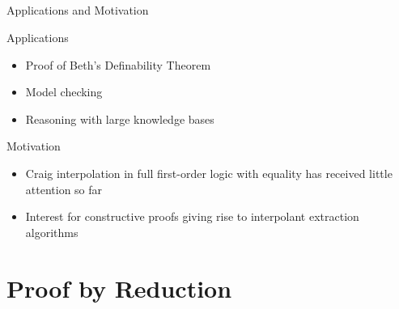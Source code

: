 \documentclass[final,compress]{beamer}
\begin{document}
\subsection{}
\begin{frame}{Applications and Motivation}
	\begin{block}{Applications}
		\begin{itemize}
			\item Proof of Beth's Definability Theorem
			\item Model checking
			\item Reasoning with large knowledge bases
		\end{itemize}
	\end{block}
	\pause
	\begin{block}{Motivation}
		\begin{itemize}
			\item Craig interpolation in full first-order logic with equality has received little attention so far
			\item Interest for constructive proofs giving rise to interpolant extraction algorithms
		\end{itemize}
	\end{block}

\end{frame}



\section{Proof by Reduction}
\end{document}
